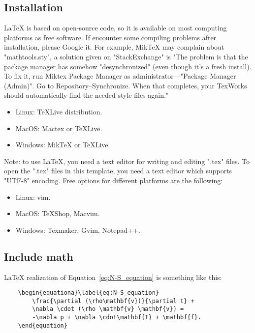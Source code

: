 \subsection{Installation}
LaTeX is based on open-source code, so it is available on most computing platforms as free software. If encounter some compiling problems after installation, please Google it. For example, MikTeX may complain about "mathtools.sty", a solution given on "StackExchange" is "The problem is that the package manager has somehow "desynchronized" (even though it's a fresh install). To fix it, run Miktex Package Manager as administrator---"Package Manager (Admin)". Go to Repository--Synchronize. When that completes, your TexWorks should automatically find the needed style files again."
\begin{itemize}
    \item Linux: TeXLive distribution. 
    \item MacOS: Mactex or TeXLive.
    \item Windows: MikTeX or TeXLive. 
\end{itemize}

Note: to use \LaTeX{}, you need a text editor for writing and editing ".tex" files. To open the ".tex" files in this template, you need a text editor which supports "UTF-8" encoding. Free options for different platforms are the following:
\begin{itemize}
    \item Linux: vim. 
    \item MacOS: TeXShop, Macvim.
    \item Windows: Texmaker, Gvim, Notepad++. 
\end{itemize}

\subsection{Include math}
\LaTeX{} realization of Equation~\ref{eq:N-S_equation} is something like this:
\begin{center}
    \small
    \begin{verbatim}
    \begin{equationa}\label{eq:N-S_equation}
        \frac{\partial (\rho\mathbf{v})}{\partial t} +
        \nabla \cdot (\rho \mathbf{v} \mathbf{v}) =
        -\nabla p + \nabla \cdot\mathbf{T} + \mathbf{f}. 
    \end{equation}    
\end{verbatim}
\end{center}

